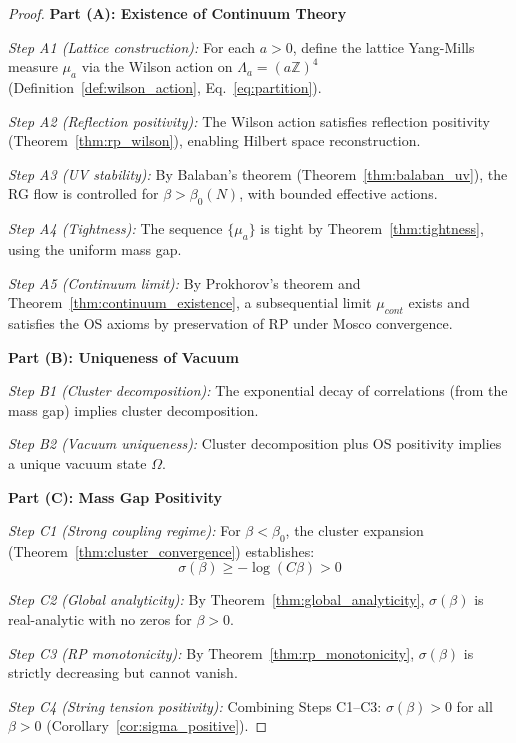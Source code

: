 \begin{proof}
\textbf{Part (A): Existence of Continuum Theory}

\textit{Step A1 (Lattice construction):}
For each $a > 0$, define the lattice Yang-Mills measure $\mu_a$ via the Wilson action on $\Lambda_a = (a\mathbb{Z})^4$ (Definition~\ref{def:wilson_action}, Eq.~\eqref{eq:partition}).

\textit{Step A2 (Reflection positivity):}
The Wilson action satisfies reflection positivity (Theorem~\ref{thm:rp_wilson}), enabling Hilbert space reconstruction.

\textit{Step A3 (UV stability):}
By Balaban's theorem (Theorem~\ref{thm:balaban_uv}), the RG flow is controlled for $\beta > \beta_0(N)$, with bounded effective actions.

\textit{Step A4 (Tightness):}
The sequence $\{\mu_a\}$ is tight by Theorem~\ref{thm:tightness}, using the uniform mass gap.

\textit{Step A5 (Continuum limit):}
By Prokhorov's theorem and Theorem~\ref{thm:continuum_existence}, a subsequential limit $\mu_{cont}$ exists and satisfies the OS axioms by preservation of RP under Mosco convergence.

\medskip
\textbf{Part (B): Uniqueness of Vacuum}

\textit{Step B1 (Cluster decomposition):}
The exponential decay of correlations (from the mass gap) implies cluster decomposition.

\textit{Step B2 (Vacuum uniqueness):}
Cluster decomposition plus OS positivity implies a unique vacuum state $\Omega$.

\medskip
\textbf{Part (C): Mass Gap Positivity}

\textit{Step C1 (Strong coupling regime):}
For $\beta < \beta_0$, the cluster expansion (Theorem~\ref{thm:cluster_convergence}) establishes:
\begin{equation}
\sigma(\beta) \geq -\log(C\beta) > 0
\end{equation}

\textit{Step C2 (Global analyticity):}
By Theorem~\ref{thm:global_analyticity}, $\sigma(\beta)$ is real-analytic with no zeros for $\beta > 0$.

\textit{Step C3 (RP monotonicity):}
By Theorem~\ref{thm:rp_monotonicity}, $\sigma(\beta)$ is strictly decreasing but cannot vanish.

\textit{Step C4 (String tension positivity):}
Combining Steps C1--C3: $\sigma(\beta) > 0$ for all $\beta > 0$ (Corollary~\ref{cor:sigma_positive}).


\end{proof}
